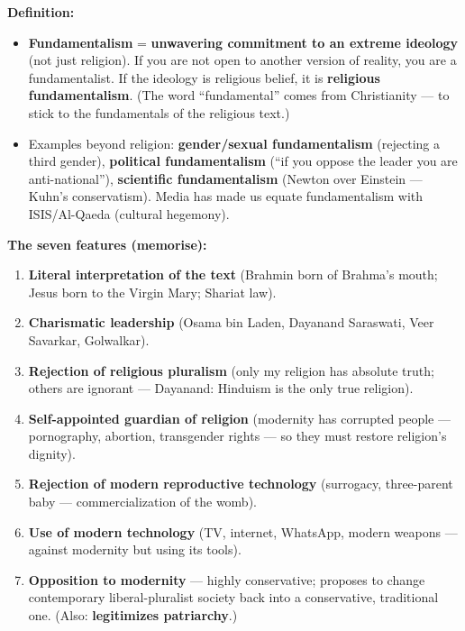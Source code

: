 \begin{KeyConcept}
\textbf{Definition:}
\begin{itemize}
\item \textbf{Fundamentalism} = \textbf{unwavering commitment to an extreme ideology} (not just religion). If you are not open to another version of reality, you are a fundamentalist. If the ideology is religious belief, it is \textbf{religious fundamentalism}. (The word ``fundamental'' comes from Christianity --- to stick to the fundamentals of the religious text.)
\item Examples beyond religion: \textbf{gender/sexual fundamentalism} (rejecting a third gender), \textbf{political fundamentalism} (``if you oppose the leader you are anti-national''), \textbf{scientific fundamentalism} (Newton over Einstein --- Kuhn's conservatism). Media has made us equate fundamentalism with ISIS/Al-Qaeda (cultural hegemony).
\end{itemize}
\end{KeyConcept}

\begin{DataFact}
\textbf{The seven features (memorise):}
\begin{enumerate}
\item \textbf{Literal interpretation of the text} (Brahmin born of Brahma's mouth; Jesus born to the Virgin Mary; Shariat law).
\item \textbf{Charismatic leadership} (Osama bin Laden, Dayanand Saraswati, Veer Savarkar, Golwalkar).
\item \textbf{Rejection of religious pluralism} (only my religion has absolute truth; others are ignorant --- Dayanand: Hinduism is the only true religion).
\item \textbf{Self-appointed guardian of religion} (modernity has corrupted people --- pornography, abortion, transgender rights --- so they must restore religion's dignity).
\item \textbf{Rejection of modern reproductive technology} (surrogacy, three-parent baby --- commercialization of the womb).
\item \textbf{Use of modern technology} (TV, internet, WhatsApp, modern weapons --- against modernity but using its tools).
\item \textbf{Opposition to modernity} --- highly conservative; proposes to change contemporary liberal-pluralist society back into a conservative, traditional one. (Also: \textbf{legitimizes patriarchy}.)
\end{enumerate}
\end{DataFact}

